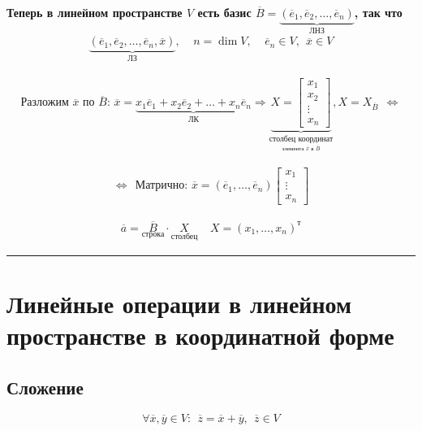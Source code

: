 \documentclass{article}
\begin{document}
\textbf{Теперь в линейном пространстве $V$ есть базис 
$\overline{B} = \underbrace{(\overline{e}_1, \overline{e}_2, \dots, \overline{e}_n)}_{\text{ЛНЗ}}$, так что}
\begin{gather*}
    \underbrace{(\overline{e}_1, \overline{e}_2, \dots, \overline{e}_n, \overline{x})}_{\text{ЛЗ}}, ~~~~~
    n = \dim V, ~~~~~ \overline{e}_n \in V, ~~\overline{x} \in V
\end{gather*}


\begin{gather*}
    \textbf{Разложим $\overline{x}$ по $\overline{B}$: } 
    \overline{x} = \underbrace{x_1 \overline{e}_1 + x_2 \overline{e}_2 + \dots + x_n \overline{e}_n}_{\text{ЛК}} \Rightarrow
    \underbrace{X = \begin{bmatrix}
        x_1    \\
        x_2    \\
        \vdots \\
        x_n
    \end{bmatrix}}_{\underset{\text{элемента } \overline{x} \text{ в } \overline{B}}{\text{столбец координат}}}, X = X_{\overline{B}}
    ~~\Leftrightarrow
\end{gather*}
 

\begin{gather*}
    \Leftrightarrow~~ \textbf{Матрично: } 
    \overline{x} = (\overline{e}_1, \dots, \overline{e}_n) \begin{bmatrix}
        x_1    \\
        \vdots \\
        x_n
    \end{bmatrix}
\end{gather*}

\begin{gather*}
    \boxed{\overline{a} = \underset{\text{строка}}{\overline{B}} \cdot \underset{\text{столбец}}{X}} ~~~~~
    X = (x_1, \dots, x_n)^{\text{т}}
\end{gather*}



\par\noindent\rule{\textwidth}{1pt}
\section{Линейные операции в линейном пространстве в координатной форме}

\subsection{Сложение}
\[
    \forall \overline{x}, \overline{y} \in V: ~~\overline{z} = \overline{x} + \overline{y}, ~~\overline{z} \in V
\]
\end{document}
